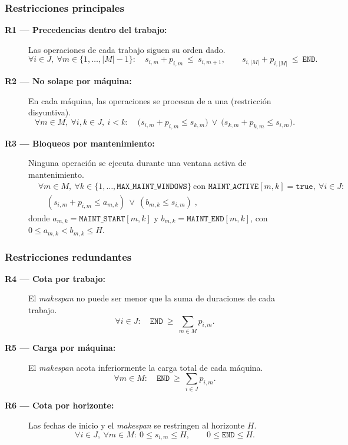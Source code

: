 \subsubsection*{Restricciones principales}
\begin{description}
  \item[\textbf{R1 — Precedencias dentro del trabajo:}] Las operaciones de cada trabajo siguen su orden dado.  
  \[
  \forall i\in J,\ \forall m\in\{1,\dots,|M|-1\}:\quad
  s_{i,m}+p_{i,m}\ \le\ s_{i,m+1},
  \qquad
  s_{i,|M|}+p_{i,|M|}\ \le\ \texttt{END}.
  \]

  \item[\textbf{R2 — No solape por máquina:}] En cada máquina, las operaciones se procesan de a una (restricción disyuntiva).  
  \[
  \forall m\in M,\ \forall i,k\in J,\ i<k:\quad
  \big(s_{i,m}+p_{i,m}\le s_{k,m}\big)\ \lor\ \big(s_{k,m}+p_{k,m}\le s_{i,m}\big).
  \]

  \item[\textbf{R3 — Bloqueos por mantenimiento:}]
  Ninguna operación se ejecuta durante una ventana activa de mantenimiento.  
  \begin{align}
  & \forall m\in M,\ \forall k\in\{1,\dots,\texttt{MAX\_MAINT\_WINDOWS}\}\ \text{con }\texttt{MAINT\_ACTIVE}[m,k]=\texttt{true},\ \forall i\in J: \nonumber\\
  & \quad (s_{i,m}+p_{i,m}\le a_{m,k})\ \lor\ (b_{m,k}\le s_{i,m})\;, \nonumber
  \end{align}
  donde \(a_{m,k}=\texttt{MAINT\_START}[m,k]\) y \(b_{m,k}=\texttt{MAINT\_END}[m,k]\), con \(0\le a_{m,k}<b_{m,k}\le H\).  
\end{description}

\subsubsection*{Restricciones redundantes}
\begin{description}
  \item[\textbf{R4 — Cota por trabajo:}] El \emph{makespan} no puede ser menor que la suma de duraciones de cada trabajo.  
  \[
  \forall i\in J:\quad \texttt{END}\ \ge\ \sum_{m\in M} p_{i,m}.
  \]

  \item[\textbf{R5 — Carga por máquina:}] El \emph{makespan} acota inferiormente la carga total de cada máquina.  
  \[
  \forall m\in M:\quad \texttt{END}\ \ge\ \sum_{i\in J} p_{i,m}.
  \]

  \item[\textbf{R6 — Cota por horizonte:}] Las fechas de inicio y el \emph{makespan} se restringen al horizonte \(H\).  
  \[
  \forall i\in J,\ \forall m\in M:\ 0\le s_{i,m}\le H, 
  \qquad 0\le \texttt{END}\le H.
  \]
\end{description}

